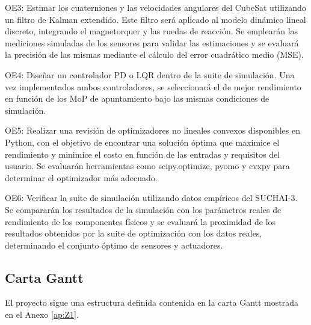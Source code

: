 OE3: Estimar los cuaterniones y las velocidades angulares del CubeSat utilizando un filtro de Kalman extendido. Este filtro será aplicado al modelo dinámico lineal discreto, integrando el magnetorquer y las ruedas de reacción. Se emplearán las mediciones simuladas de los sensores para validar las estimaciones y se evaluará la precisión de las mismas mediante el cálculo del error cuadrático medio (MSE).

OE4: Diseñar un controlador PD o LQR dentro de la suite de simulación. Una vez implementados ambos controladores, se seleccionará el de mejor rendimiento en función de los MoP de apuntamiento bajo las mismas condiciones de simulación.

OE5: Realizar una revisión de optimizadores no lineales convexos disponibles en Python, con el objetivo de encontrar una solución óptima que maximice el rendimiento y minimice el costo en función de las entradas y requisitos del usuario. Se evaluarán herramientas como scipy.optimize, pyomo y cvxpy para determinar el optimizador más adecuado.

OE6: Verificar la suite de simulación utilizando datos empíricos del SUCHAI-3. Se compararán los resultados de la simulación con los parámetros reales de rendimiento de los componentes físicos y se evaluará la proximidad de los resultados obtenidos por la suite de optimización con los datos reales, determinando el conjunto óptimo de sensores y actuadores.
                                                                     \subsection{Carta Gantt}                                                                                                                                                                                                               
El proyecto sigue una estructura definida contenida en la carta Gantt mostrada en el Anexo \ref{ap:Z1}.
